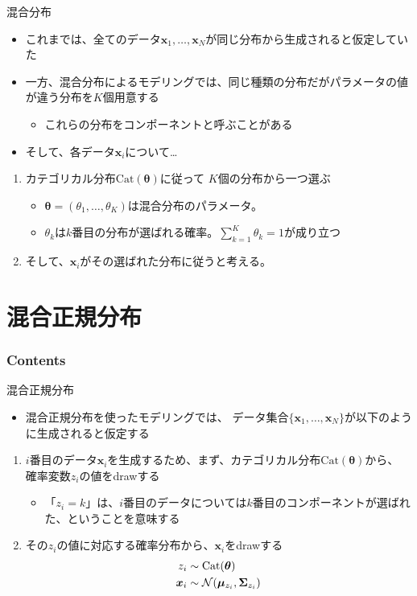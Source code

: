 \documentclass[aspectratio=169,unicode,dvipdfmx,14pt]{beamer}
\begin{document}
\begin{frame}{混合分布}
\begin{itemize}
\item これまでは、全てのデータ$\bm{x}_1, \ldots, \bm{x}_N$が同じ分布から生成されると仮定していた
\item 一方、混合分布によるモデリングでは、同じ種類の分布だがパラメータの値が違う分布を$K$個用意する
\begin{itemize}
\item これらの分布をコンポーネントと呼ぶことがある
\end{itemize}
\item そして、各データ$\bm{x}_i$について…
\end{itemize}
\begin{enumerate}
\item カテゴリカル分布$\mbox{Cat}(\bm{\theta})$に従って
$K$個の分布から一つ選ぶ
\begin{itemize}
\item $\bm{\theta}=(\theta_1,\ldots,\theta_K)$は混合分布のパラメータ。
\item $\theta_k$は$k$番目の分布が選ばれる確率。$\sum_{k=1}^K \theta_k = 1$が成り立つ
\end{itemize}
\item そして、$\bm{x}_i$がその選ばれた分布に従うと考える。
\end{enumerate}
\end{frame}


\section{混合正規分布}

\begin{frame}\frametitle{Contents}
\Large \tableofcontents[currentsection]
\end{frame}

\begin{frame}{混合正規分布}
\begin{itemize}
\item 混合正規分布を使ったモデリングでは、
データ集合$\{\bm{x}_1, \ldots, \bm{x}_N\}$が以下のように生成されると仮定する
\end{itemize}
\begin{enumerate}
\item $i$番目のデータ$\bm{x}_i$を生成するため、まず、カテゴリカル分布$\mbox{Cat}(\bm{\theta})$から、
確率変数$z_i$の値をdrawする
\begin{itemize}
\item 「$z_i = k$」は、$i$番目のデータについては$k$番目のコンポーネントが選ばれた、ということを意味する
\end{itemize}
\item その$z_i$の値に対応する確率分布から、$\bm{x}_i$をdrawする
\begin{align}
z_i & \sim \mbox{Cat}(\bm{\theta}) \notag \\
\bm{x}_i & \sim \mathcal{N}(\bm{\mu}_{z_i}, \bm{\Sigma}_{z_i})
\end{align}
\end{enumerate}
\end{frame}
\end{document}
